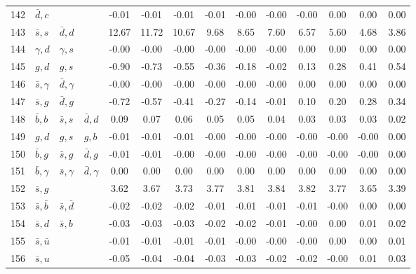 \begin{tabularx}{\textwidth}{rXXX@{}S@{}S@{}S@{}S@{}S@{}S@{}S@{}S@{}S@{}S}
142 & $\bar d, c$      &                   &                  & -0.01 & -0.01 & -0.01 & -0.01 & -0.00 & -0.00 & -0.00 &  0.00 &  0.00 &  0.00 \\
143 & $\bar s, s$      & $\bar d, d$       &                  & 12.67 & 11.72 & 10.67 &  9.68 &  8.65 &  7.60 &  6.57 &  5.60 &  4.68 &  3.86 \\
144 & $\gamma, d$      & $\gamma, s$       &                  & -0.00 & -0.00 & -0.00 & -0.00 & -0.00 & -0.00 &  0.00 &  0.00 &  0.00 &  0.00 \\
145 & $g, d$           & $g, s$            &                  & -0.90 & -0.73 & -0.55 & -0.36 & -0.18 & -0.02 &  0.13 &  0.28 &  0.41 &  0.54 \\
146 & $\bar s, \gamma$ & $\bar d, \gamma$  &                  & -0.00 & -0.00 & -0.00 & -0.00 & -0.00 & -0.00 &  0.00 &  0.00 &  0.00 &  0.00 \\
147 & $\bar s, g$      & $\bar d, g$       &                  & -0.72 & -0.57 & -0.41 & -0.27 & -0.14 & -0.01 &  0.10 &  0.20 &  0.28 &  0.34 \\
148 & $\bar b,  b$     & $\bar s, s$       & $\bar d, d$      &  0.09 &  0.07 &  0.06 &  0.05 &  0.05 &  0.04 &  0.03 &  0.03 &  0.03 &  0.02 \\
149 & $g,  d$          & $g, s$            & $g, b$           & -0.01 & -0.01 & -0.01 & -0.00 & -0.00 & -0.00 & -0.00 & -0.00 & -0.00 &  0.00 \\
150 & $\bar b, g$      & $\bar s, g$       & $\bar d, g$      & -0.01 & -0.01 & -0.00 & -0.00 & -0.00 & -0.00 & -0.00 & -0.00 & -0.00 &  0.00 \\
151 & $\bar b, \gamma$ & $\bar s, \gamma$  & $\bar d, \gamma$ &  0.00 &  0.00 &  0.00 &  0.00 &  0.00 &  0.00 &  0.00 &  0.00 &  0.00 &  0.00 \\
152 & $\bar s, g$      &                   &                  &  3.62 &  3.67 &  3.73 &  3.77 &  3.81 &  3.84 &  3.82 &  3.77 &  3.65 &  3.39 \\
153 & $\bar s, \bar b$ & $\bar s, \bar d$  &                  & -0.02 & -0.02 & -0.02 & -0.01 & -0.01 & -0.01 & -0.01 & -0.00 &  0.00 &  0.00 \\
154 & $\bar s, d$      & $\bar s, b$       &                  & -0.03 & -0.03 & -0.03 & -0.02 & -0.02 & -0.01 & -0.00 &  0.00 &  0.01 &  0.02 \\
155 & $\bar s, \bar u$ &                   &                  & -0.01 & -0.01 & -0.01 & -0.01 & -0.00 & -0.00 & -0.00 &  0.00 &  0.00 &  0.01 \\
156 & $\bar s, u$      &                   &                  & -0.05 & -0.04 & -0.04 & -0.03 & -0.03 & -0.02 & -0.02 & -0.00 &  0.01 &  0.03 \\

\end{tabularx}
